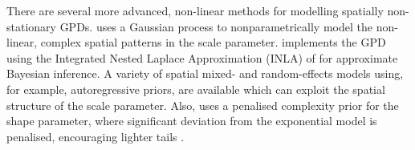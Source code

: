 \documentclass{article}
\numberwithin{equation}{section}
\begin{document}


There are several more advanced, non-linear methods for modelling spatially non-stationary GPDs.
\cite{Cooley2007} uses a Gaussian process to nonparametrically model the non-linear, complex spatial patterns in the scale parameter.
\cite{Opitz2018} implements the GPD using the Integrated Nested Laplace Approximation (INLA) of \cite{Rue2009} for approximate Bayesian inference.
A variety of spatial mixed- and random-effects models using, for example, autoregressive priors, are available which can exploit the spatial structure of the scale parameter.
Also, \cite{Opitz2018} uses a penalised complexity prior for the shape parameter, where significant deviation from the exponential model is penalised, encouraging lighter tails \cite{Simpson2015}.
\end{document}
